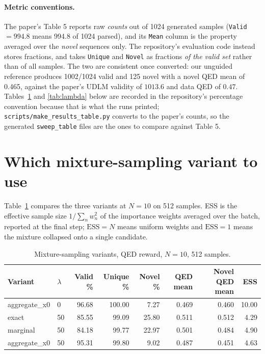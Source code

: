 \documentclass[11pt]{article}
\begin{document}
\paragraph{Metric conventions.}
The paper's Table 5 reports raw \emph{counts} out of 1024 generated samples
(\texttt{Valid} $= 994.8$ means 994.8 of 1024 parsed), and its \texttt{Mean}
column is the property averaged over the \emph{novel} sequences only. The
repository's evaluation code instead stores fractions, and takes
\texttt{Unique} and \texttt{Novel} as fractions \emph{of the valid set} rather
than of all samples. The two are consistent once converted: our unguided
reference produces 1002/1024 valid and 125 novel with a novel QED mean of
0.465, against the paper's UDLM validity of $1013.6$ and data QED of $0.47$.
Tables~\ref{tab:modes} and \ref{tab:lambda} below are recorded in the
repository's percentage convention because that is what the runs printed;
\texttt{scripts/make\_results\_table.py} converts to the paper's counts, so the
generated \texttt{sweep\_table} files are the ones to compare against Table 5.

\section{Which mixture-sampling variant to use}
\label{sec:modes}

Table~\ref{tab:modes} compares the three variants at $N = 10$ on 512 samples.
ESS is the effective sample size $1/\sum_n w_n^2$ of the importance weights
averaged over the batch, reported at the final step; $\mathrm{ESS} = N$ means
uniform weights and $\mathrm{ESS} = 1$ means the mixture collapsed onto a
single candidate.

\begin{table}[h]
\centering
\caption{Mixture-sampling variants, QED reward, $N=10$, 512 samples.}
\label{tab:modes}
\begin{tabular}{llrrrrrr}
\toprule
Variant & $\lambda$ & Valid \% & Unique \% & Novel \% & QED mean & Novel QED mean & ESS \\
\midrule
aggregate\_x0 & 0   & 96.68 & 100.00 & 7.27  & 0.469 & 0.460 & 10.00 \\
\midrule
exact         & 50  & 85.55 & 99.09  & 25.80 & 0.511 & 0.512 & 4.29 \\
marginal      & 50  & 84.18 & 99.77  & 22.97 & 0.501 & 0.484 & 4.90 \\
aggregate\_x0 & 50  & 95.31 & 99.80  & 9.02  & 0.487 & 0.451 & 4.63 \\
\bottomrule
\end{tabular}
\end{table}
\end{document}
